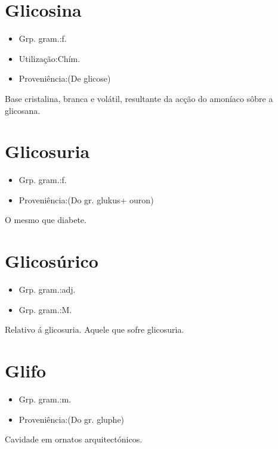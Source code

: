 \section{Glicosina}
\begin{itemize}
\item {Grp. gram.:f.}
\end{itemize}
\begin{itemize}
\item {Utilização:Chím.}
\end{itemize}
\begin{itemize}
\item {Proveniência:(De \textunderscore glicose\textunderscore )}
\end{itemize}
Base cristalina, branca e volátil, resultante da acção do amoníaco sôbre a glicosana.
\section{Glicosuria}
\begin{itemize}
\item {Grp. gram.:f.}
\end{itemize}
\begin{itemize}
\item {Proveniência:(Do gr. \textunderscore glukus\textunderscore  + \textunderscore ouron\textunderscore )}
\end{itemize}
O mesmo que \textunderscore diabete\textunderscore .
\section{Glicosúrico}
\begin{itemize}
\item {Grp. gram.:adj.}
\end{itemize}
\begin{itemize}
\item {Grp. gram.:M.}
\end{itemize}
Relativo á glicosuria.
Aquele que sofre glicosuria.
\section{Glifo}
\begin{itemize}
\item {Grp. gram.:m.}
\end{itemize}
\begin{itemize}
\item {Proveniência:(Do gr. \textunderscore gluphe\textunderscore )}
\end{itemize}
Cavidade em ornatos arquitectónicos.
